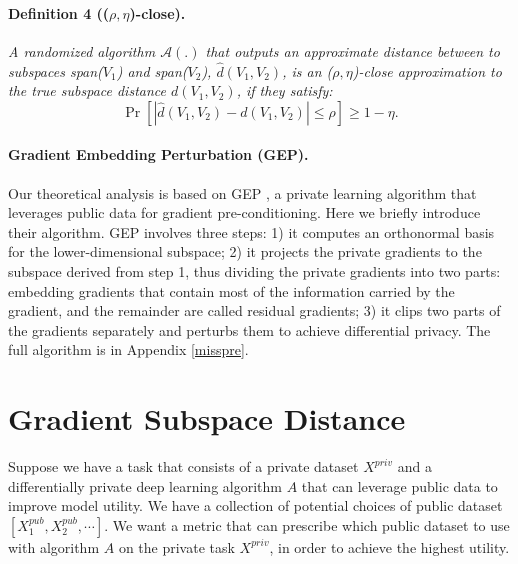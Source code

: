 \documentclass[11pt]{article}
\begin{document}
\paragraph{Definition 4 (($\rho, \eta$)-close).} \textit{A randomized algorithm $\mathcal{A}(.)$ that outputs an approximate distance between to subspaces span($V_1$) and span($V_2$), $\hat{d}\left(V_1, V_2\right)$, is an \emph{($\rho, \eta$)-close} approximation to the true subspace distance $d\left(V_1, V_2\right)$, if they satisfy:}
$$
    \Pr\left[|\hat{d}\left(V_1, V_2\right) - d\left(V_1, V_2\right)| \le \rho \right] \geq 1 - \eta.
$$


\paragraph{Gradient Embedding Perturbation (GEP).} Our theoretical analysis is based on GEP \cite{donot}, a private learning algorithm that leverages public data for gradient pre-conditioning. Here we briefly introduce their algorithm. GEP involves three steps: 1) it computes an orthonormal basis for the lower-dimensional subspace; 2) it projects the private gradients to the subspace derived from step 1, thus dividing the private gradients into two parts: embedding gradients that contain most of the information carried by the gradient, and the remainder are called residual gradients; 3) it clips two parts of the gradients separately and perturbs them to achieve differential privacy. The full algorithm is in Appendix \ref{misspre}.


\section{Gradient Subspace Distance}
\label{sec:GSD}
Suppose we have a task that consists of a private dataset $X^{priv}$ and a differentially private deep learning algorithm $A$ that can leverage public data to improve model utility. We have a collection of potential choices of public dataset $[X_1^{pub}, X_2^{pub}, \cdots]$. We want a metric that can prescribe which public dataset to use with algorithm $A$ on the private task $X^{priv}$, in order to achieve the highest utility.
\end{document}
